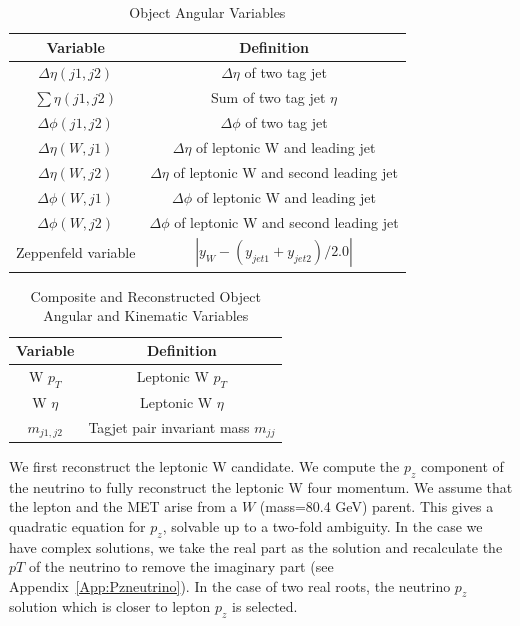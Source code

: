 \begin{table}[h!]
\small
\begin{center}
\begin{tabular}{|c|c|}
\hline
Variable & Definition\\ \hline
$\Delta \eta (j1,j2)$ & $\Delta \eta$ of two tag jet\\ \hline
$\sum \eta (j1,j2)$ & Sum of two tag jet $\eta$\\ \hline
$\Delta \phi (j1,j2)$ & $\Delta \phi$ of two tag jet \\\hline
$\Delta \eta (W,j1)$ & $\Delta \eta$ of leptonic W and leading jet \\\hline
$\Delta \eta (W,j2)$ & $\Delta \eta$ of leptonic W and second leading jet \\\hline
$\Delta \phi (W,j1)$ & $\Delta \phi$ of leptonic W and leading jet \\\hline
$\Delta \phi (W,j2)$ & $\Delta \phi$ of leptonic W and second leading jet \\\hline
Zeppenfeld variable & $|y_{W} -(y_{jet1} + y_{jet2})/2.0|$\\ \hline
\end{tabular}
\caption{Object Angular Variables}
\label{tab:objang}
\end{center}
\end{table}
      
\begin{table}[h!]
\small
\begin{center}
\begin{tabular}{|c|c|}
\hline
Variable & Definition\\ \hline
W $p_{T}$ & Leptonic W $p_{T}$\\ \hline
W $\eta$ & Leptonic W $\eta$\\ \hline
$m_{j1,j2}$ & Tagjet pair invariant mass $m_{jj}$\\ \hline
\end{tabular}
\caption{Composite and Reconstructed Object Angular and Kinematic Variables}
\label{tab:recoangu}
\end{center}
\end{table}

We first reconstruct the leptonic W candidate. We compute the $p_z$ component of the neutrino to fully reconstruct the leptonic W four momentum.
We assume that the lepton and the MET arise from a $W$ (mass=80.4 GeV) parent. This gives a quadratic equation for $p_z$, solvable up to a two-fold ambiguity. In the case we have complex solutions, we take the real part as the solution and recalculate the $pT$ of the neutrino to remove the imaginary part (see Appendix~\ref{App:Pzneutrino}). In the case of two real roots, the neutrino $p_{z}$ solution which is closer to lepton $p_{z}$ is selected.

